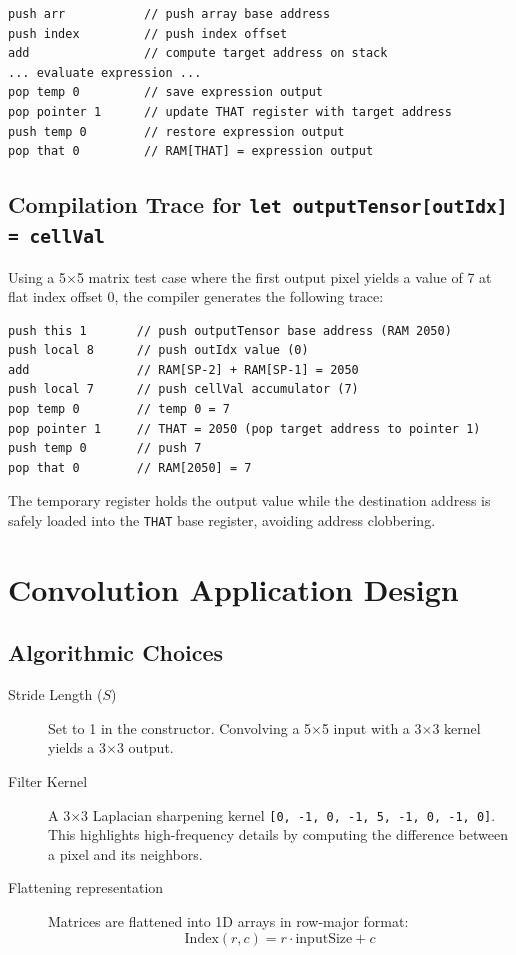 \documentclass[11pt,a4paper]{article}
\begin{document}
\begin{lstlisting}[style=vmcode, caption={Secure Array Write VM Bytecode}]
push arr           // push array base address
push index         // push index offset
add                // compute target address on stack
... evaluate expression ...
pop temp 0         // save expression output
pop pointer 1      // update THAT register with target address
push temp 0        // restore expression output
pop that 0         // RAM[THAT] = expression output
\end{lstlisting}

\subsection{Compilation Trace for \texttt{let outputTensor[outIdx] = cellVal}}

Using a 5$\times$5 matrix test case where the first output pixel yields a value of 7 at flat index offset 0, the compiler generates the following trace:

\begin{lstlisting}[style=vmcode, caption={Trace for Array Assignation}]
push this 1       // push outputTensor base address (RAM 2050)
push local 8      // push outIdx value (0)
add               // RAM[SP-2] + RAM[SP-1] = 2050
push local 7      // push cellVal accumulator (7)
pop temp 0        // temp 0 = 7
pop pointer 1     // THAT = 2050 (pop target address to pointer 1)
push temp 0       // push 7
pop that 0        // RAM[2050] = 7
\end{lstlisting}

The temporary register holds the output value while the destination address is safely loaded into the \texttt{THAT} base register, avoiding address clobbering.

\section{Convolution Application Design}

\subsection{Algorithmic Choices}

\begin{description}
    \item[Stride Length ($S$)] Set to 1 in the constructor. Convolving a 5$\times$5 input with a 3$\times$3 kernel yields a 3$\times$3 output.
    \item[Filter Kernel] A 3$\times$3 Laplacian sharpening kernel \texttt{[0, -1, 0, -1, 5, -1, 0, -1, 0]}. This highlights high-frequency details by computing the difference between a pixel and its neighbors.
    \item[Flattening representation] Matrices are flattened into 1D arrays in row-major format:
    \begin{equation*}
    \text{Index}(r, c) = r \cdot \text{inputSize} + c
    \end{equation*}
\end{description}
\end{document}
